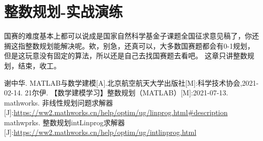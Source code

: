 \documentclass[a4paper,20pt]{article}
\begin{document}
\section{整数规划-实战演练}
国赛的难度基本上都可以说成是国家自然科学基金子课题全国征求意见稿了，你还搁这指整数规划能解决呢。欸，别急，还真可以，大多数国赛题都会有0-1规划，但是这玩意没有固定的算法，所以还是自己去找国赛题去看吧。
这章只讲整数规划，结束，收工。



\newpage
\begin{thebibliography}{99}
    谢中华. MATLAB与数学建模[A].北京航空航天大学出版社[M]:科学技术协会,2021-02-14.
    21尔伊. 【数学建模学习】整数规划（MATLAB）[M]:2021-07-13.
    mathworks. 非线性规划问题求解器[J]:\url{https://ww2.mathworks.cn/help/optim/ug/linprog.html#description}
    mathwprks. 整数规划intLinprog求解器[J]:\url{https://ww2.mathworks.cn/help/optim/ug/intlinprog.html}

\end{thebibliography}

\newpage
\end{document}
